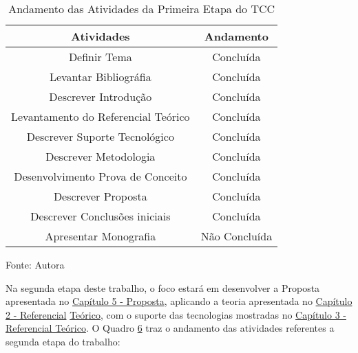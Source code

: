 \begin{table}[htbp]
    \centering
    \begin{threeparttable}
        \caption{Andamento das Atividades da Primeira Etapa do TCC}
        \label{tab:5}
        \begin{tabular}{| c | c |}
        \hline  
        Atividades & Andamento \\
        \hline 
        Definir Tema & Concluída \\
        \hline 
        Levantar Bibliográfia & Concluída \\
        \hline 
        Descrever Introdução & Concluída \\
        \hline 
        Levantamento do Referencial Teórico &  Concluída \\
        \hline 
        Descrever Suporte Tecnológico & Concluída \\
        \hline 
        Descrever Metodologia & Concluída \\
        \hline 
        Desenvolvimento Prova de Conceito & Concluída \\
        \hline 
        Descrever Proposta & Concluída \\
        \hline 
        Descrever Conclusões iniciais & Concluída \\
        \hline
        Apresentar Monografia & Não Concluída \\
        \hline 
        \end{tabular}
        \begin{tablenotes}
            \small
            \centering
            \item Fonte: Autora
        \end{tablenotes}
    \end{threeparttable}
\end{table}

Na segunda etapa deste trabalho, o foco estará em desenvolver a Proposta apresentada no 
\hyperref[chap:proposta]{Capítulo 5 - Proposta}, aplicando a teoria apresentada no 
\hyperref[chap:refteor]{Capítulo 2 - Referencial} \hyperref[chap:refteor]{Teórico}, com o suporte das tecnologias
mostradas no \hyperref[chap:suptec]{Capítulo 3 - Referencial Teórico}. O Quadro \hyperref[tab:6]{6}
traz o andamento das atividades referentes a segunda etapa do trabalho:

